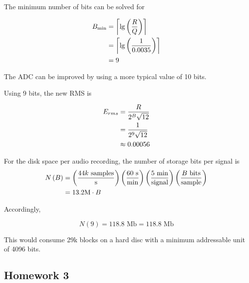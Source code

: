 The minimum number of bits can be solved for

\begin{equation}
\begin{aligned}
  {B_{\min }} &= \left\lceil {\lg \left( {\frac{R}{Q}} \right)} \right\rceil  \hfill \\
   &= \left\lceil {\lg \left( {\frac{1}{{0.0035}}} \right)} \right\rceil  \hfill \\
   &= 9 \hfill \\ 
\end{aligned} 
\end{equation}

The ADC can be improved by using a more typical value of 10 bits.

Using 9 bits, the new RMS is

\begin{equation}
\begin{aligned}
  E_{rms} &= \frac{R}{{{2^B}\sqrt{12}}} \hfill \\
   &= \frac{1}{{{2^9}\sqrt {12} }} \hfill \\
   &\approx 0.00056 \hfill \\ 
\end{aligned} 
\end{equation}


For the disk space per audio recording, the number of storage bits per signal is
\begin{equation}
\begin{aligned}
  N\left( B \right) &= \left( {\frac{{44k{\text{ samples}}}}{{\text{s}}}} \right)\left( {\frac{{60{\text{ s}}}}{{{\text{min}}}}} \right)\left( {\frac{{5{\text{ min}}}}{{{\text{signal}}}}} \right)\left( {\frac{{B{\text{ bits}}}}{{{\text{sample}}}}} \right) \hfill \\
   &= 13.2{\text{M}} \cdot B \hfill \\ 
\end{aligned} 
\end{equation}

Accordingly,

\begin{equation}
N(9)=118.8 \text{ Mb}= 118.8 \text{ Mb}
\end{equation}

This would consume 29k blocks on a hard disc with a minimum addressable unit of 4096 bits.

\subsection{Homework 3}

